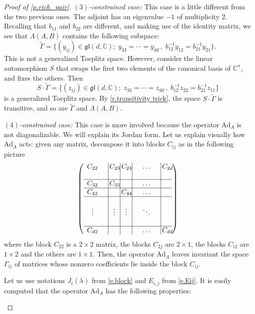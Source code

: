 \documentclass[10pt, a4paper]{amsart}
\theoremstyle{plain}
\theoremstyle{definition}
\theoremstyle{remark}
\theoremstyle{note}
\numberwithin{equation}{section}
\begin{document}
\begin{proof}[Proof of \cref{p.rich_pair}]
\medskip\noindent\emph{$(3)$-constrained case:}
This case is a little different from the two previous ones.
The adjoint has an eigenvalue $-1$ of multiplicity $2$.
Recalling that $b_{11}$ and $b_{22}$ are different, and making use of the identity matrix,
we see that $\Lambda(A,B)$ contains the following subspace:
$$
\tilde \Gamma = 
\big \{ (y_{ij}) \in {\mathfrak{gl}}(d,{\mathbb{C}}) ; \;  y_{33} = \cdots = y_{dd}\, , \;
b_{12}^{-1} y_{12} = b_{21}^{-1} y_{21}
\big \}.
$$
This is not a generalized Toeplitz space.
However, consider the linear automorphism $S$ that swaps the first two elements of the canonical basis of ${\mathbb{C}}^n$, and fixes the others.
Then
$$
S \cdot \tilde \Gamma = 
\big \{ (z_{ij}) \in {\mathfrak{gl}}(d,{\mathbb{C}}) ; \;  z_{33} = \cdots = z_{dd}\, , \;
b_{12}^{-1} z_{22} = b_{21}^{-1} z_{11}
\big \}
$$
is a generalized Toeplitz space.
By \cref{r.transitivity trick}, the space $S \cdot \tilde \Gamma$ is transitive, and so are $\tilde \Gamma$ and $\Lambda(A,B)$.

\medskip\noindent\emph{$(4)$-constrained case:}
This case is more involved because the operator ${\mathrm{Ad}}_A$ is not diagonalizable.
We will explain its Jordan form.
Let us explain visually how ${\mathrm{Ad}}_A$ acts: given any matrix, decompose it into blocks $C_{ij}$ as in the following picture $$\left(
\begin{array}{cc|c|c|ccc|c}
C_{22}& &\!\!C_{23}\!\!\! &\!\!C_{24}\!\!\! &  &\hdots & &\!\! C_{2d}\!\!\!\!\\
& & & & & & &\\
\hline C_{32} &&\!\!C_{33}\!\!\!& & &\hdots  &\\
\hline C_{42} & & &\!\!C_{44}\!\!\! & &\hdots  &\\
\hline & & & & & & &\\
\vdots& &\vdots &\vdots & &\ddots & &\\
& & & & & & &\\
\hline C_{d2}& & & & &\hdots & &\!\!C_{dd}\!\!\!\!\\
\end{array}
\right)
$$
where the block $C_{22}$ is a $2\times 2$ matrix, the blocks $C_{2j}$ are $2\times 1$, the blocks $C_{i2}$ are $1\times 2$ and the  others are $1\times 1$. Then, the operator ${\mathrm{Ad}}_A$ leaves invariant the space $\Gamma_{ij}$ of matrices whose nonzero coefficients lie inside the block $C_{ij}$.

Let us use notations $J_t(\lambda)$ from \eqref{e.block} and  $E_{i,j}$ from \eqref{e.Eij}.
It is easily computed that the operator ${\mathrm{Ad}}_A$ has the following properties:
\begin{itemize}
	

\end{itemize}
\end{proof}
\end{document}
